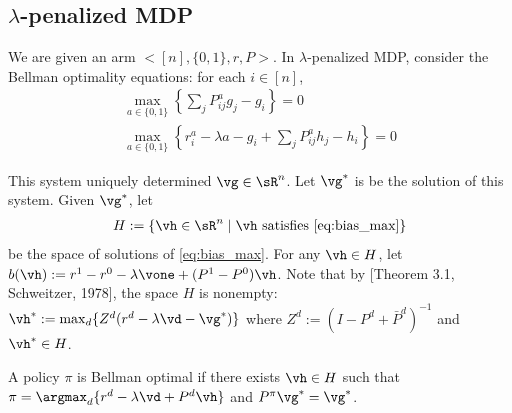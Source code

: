 \subsection{$\lambda$-penalized MDP}

We are given an arm $<[n],\{0,1\},r,P>$. In $\lambda$-penalized MDP, consider the Bellman optimality equations: for each $i\in[n]$,
\begin{align}
    \max_{a\in\{0,1\}}{\left\{\sum_jP^a_{ij}g_j-g_i\right\}} =0 \label{eq:gain_max}\\
\max_{a\in\{0,1\}}{\left\{r^a_i-\lambda a-g_i +\sum_jP^a_{ij}h_j-h_i\right\}} =0 \label{eq:bias_max}
\end{align}

This system uniquely determined $\vg\in\sR^n$.
Let $\vg^*$ is be the solution of this system. Given $\vg^*$, let
\begin{align}
H:=\{\vh\in \sR^n \mid \vh \text{ satisfies } \eqref{eq:bias_max}\}
\end{align}
be the space of solutions of \eqref{eq:bias_max}.
For any $\vh\in H$, let $b(\vh):=r^1-r^0-\lambda \vone +(P^1-P^0)\vh$. 
Note that by [Theorem 3.1, Schweitzer, 1978], the space $H$ is nonempty: $\vh^*:=\max_d\{Z^d(r^d -\lambda \vd -\vg^*)\}$ where $Z^d:=(I-P^d +\bar{P}^d)^{-1}$ and $\vh^*\in H$.

\begin{defn}
\label{defn:BO_policy}
A policy $\pi$ is Bellman optimal if there exists $\vh\in H$ such that $\pi=\argmax_d\{r^d -\lambda \vd +P^d\vh\}$ and $P^\pi\vg^*=\vg^*$.
\end{defn}

